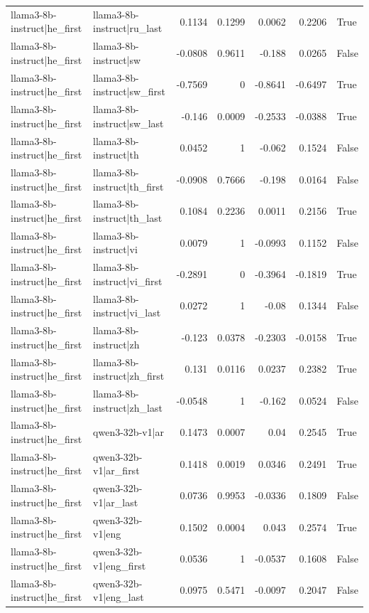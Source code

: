 \begin{table}
\begin{tabular}{l l r r r r l}
llama3-8b-instruct|he_first & llama3-8b-instruct|ru_last & 0.1134 & 0.1299 & 0.0062 & 0.2206 & True \\
llama3-8b-instruct|he_first & llama3-8b-instruct|sw & -0.0808 & 0.9611 & -0.188 & 0.0265 & False \\
llama3-8b-instruct|he_first & llama3-8b-instruct|sw_first & -0.7569 & 0 & -0.8641 & -0.6497 & True \\
llama3-8b-instruct|he_first & llama3-8b-instruct|sw_last & -0.146 & 0.0009 & -0.2533 & -0.0388 & True \\
llama3-8b-instruct|he_first & llama3-8b-instruct|th & 0.0452 & 1 & -0.062 & 0.1524 & False \\
llama3-8b-instruct|he_first & llama3-8b-instruct|th_first & -0.0908 & 0.7666 & -0.198 & 0.0164 & False \\
llama3-8b-instruct|he_first & llama3-8b-instruct|th_last & 0.1084 & 0.2236 & 0.0011 & 0.2156 & True \\
llama3-8b-instruct|he_first & llama3-8b-instruct|vi & 0.0079 & 1 & -0.0993 & 0.1152 & False \\
llama3-8b-instruct|he_first & llama3-8b-instruct|vi_first & -0.2891 & 0 & -0.3964 & -0.1819 & True \\
llama3-8b-instruct|he_first & llama3-8b-instruct|vi_last & 0.0272 & 1 & -0.08 & 0.1344 & False \\
llama3-8b-instruct|he_first & llama3-8b-instruct|zh & -0.123 & 0.0378 & -0.2303 & -0.0158 & True \\
llama3-8b-instruct|he_first & llama3-8b-instruct|zh_first & 0.131 & 0.0116 & 0.0237 & 0.2382 & True \\
llama3-8b-instruct|he_first & llama3-8b-instruct|zh_last & -0.0548 & 1 & -0.162 & 0.0524 & False \\
llama3-8b-instruct|he_first & qwen3-32b-v1|ar & 0.1473 & 0.0007 & 0.04 & 0.2545 & True \\
llama3-8b-instruct|he_first & qwen3-32b-v1|ar_first & 0.1418 & 0.0019 & 0.0346 & 0.2491 & True \\
llama3-8b-instruct|he_first & qwen3-32b-v1|ar_last & 0.0736 & 0.9953 & -0.0336 & 0.1809 & False \\
llama3-8b-instruct|he_first & qwen3-32b-v1|eng & 0.1502 & 0.0004 & 0.043 & 0.2574 & True \\
llama3-8b-instruct|he_first & qwen3-32b-v1|eng_first & 0.0536 & 1 & -0.0537 & 0.1608 & False \\
llama3-8b-instruct|he_first & qwen3-32b-v1|eng_last & 0.0975 & 0.5471 & -0.0097 & 0.2047 & False \\

\end{tabular}
\end{table}
